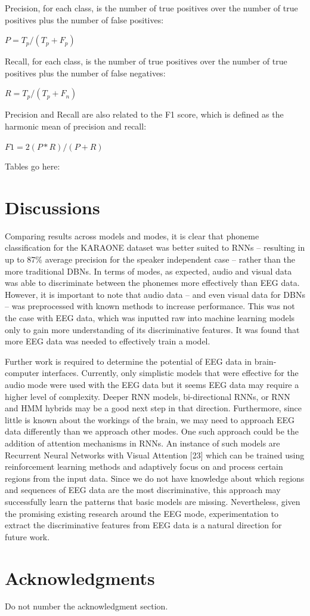 \documentclass[11pt,letterpaper]{article}
\begin{document}
Precision, for each class, is the number of true positives over the number of true positives plus the number of false positives:

$P=T_p/(T_p+F_p )$

Recall, for each class, is the number of true positives over the number of true positives plus the number of false negatives:

$R=T_p/(T_p+F_n )$

Precision and Recall are also related to the F1 score, which is defined as the harmonic mean of precision and recall:

$F1=2 (P*R)/(P+R)$

Tables go here:


\section{Discussions}
Comparing results across models and modes, it is clear that phoneme classification for the KARAONE dataset was better suited to RNNs – resulting in up to 87\% average precision for the speaker independent case – rather than the more traditional DBNs. In terms of modes, as expected, audio and visual data was able to discriminate between the phonemes more effectively than EEG data. However, it is important to note that audio data – and even visual data for DBNs – was preprocessed with known methods to increase performance. This was not the case with EEG data, which was inputted raw into machine learning models only to gain more understanding of its discriminative features. It was found that more EEG data was needed to effectively train a model. 

Further work is required to determine the potential of EEG data in brain-computer interfaces. Currently, only simplistic models that were effective for the audio mode were used with the EEG data but it seems EEG data may require a higher level of complexity. Deeper RNN models, bi-directional RNNs, or RNN and HMM hybrids may be a good next step in that direction. Furthermore, since little is known about the workings of the brain, we may need to approach EEG data differently than we approach other modes. One such approach could be the addition of attention mechanisms in RNNs. An instance of such models are Recurrent Neural Networks with Visual Attention [23] which can be trained using reinforcement learning methods and adaptively focus on and process certain regions from the input data. Since we do not have knowledge about which regions and sequences of EEG data are the most discriminative, this approach may successfully learn the patterns that basic models are missing. Nevertheless, given the promising existing research around the EEG mode, experimentation to extract the discriminative features from EEG data is a natural direction for future work. 


\section*{Acknowledgments}

Do not number the acknowledgment section.



\end{document}
